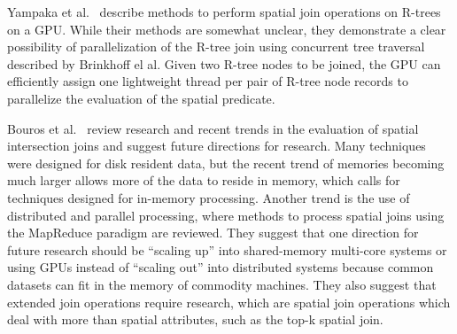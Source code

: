 Yampaka et al.~\cite{yampaka2012spatial} describe methods to perform spatial join operations on R-trees on a GPU. While their methods are somewhat unclear, they demonstrate a clear possibility of parallelization of the R-tree join using concurrent tree traversal described by Brinkhoff el al. Given two R-tree nodes to be joined, the GPU can efficiently assign one lightweight thread per pair of R-tree node records to parallelize the evaluation of the spatial predicate.

Bouros et al.~\cite{bouros2019spatial} review research and recent trends in the evaluation of spatial intersection joins and suggest future directions for research. Many techniques were designed for disk resident data, but the recent trend of memories becoming much larger allows more of the data to reside in memory, which calls for techniques designed for in-memory processing. Another trend is the use of distributed and parallel processing, where methods to process spatial joins using the MapReduce paradigm are reviewed. They suggest that one direction for future research should be ``scaling up'' into shared-memory multi-core systems or using GPUs instead of ``scaling out'' into distributed systems because common datasets can fit in the memory of commodity machines. They also suggest that extended join operations require research, which are spatial join operations which deal with more than spatial attributes, such as the top-k spatial join.


